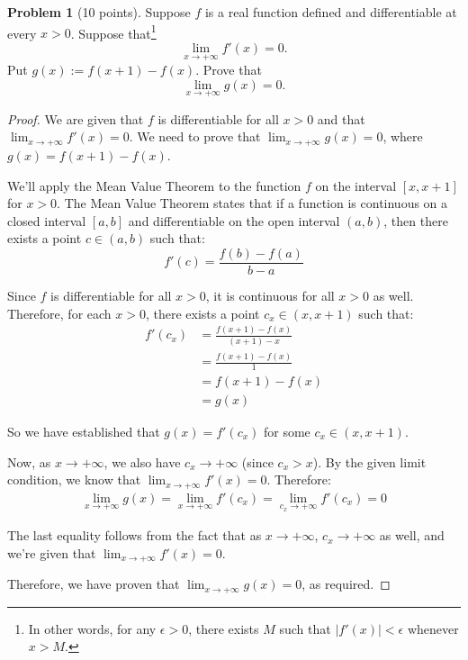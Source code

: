 \documentclass[12pt,oneside]{article}
\theoremstyle{definition}
\newtheorem{problem}{Problem}
\begin{document}
\begin{problem}[10 points]
Suppose $f$ is a real function defined and differentiable at every $x > 0$. 
Suppose that\footnote{In other words, for any $\epsilon > 0$, there exists $M$ such that $|f'(x)| < \epsilon$ whenever $x > M$.}
\[
\lim_{x \rightarrow +\infty}f'(x) = 0.
\]
Put $g(x) := f(x+1) - f(x)$. 
Prove that
\[
\lim_{x\rightarrow +\infty} g(x) = 0.
\]
\end{problem}

\begin{proof}
We are given that $f$ is differentiable for all $x > 0$ and that $\lim_{x \rightarrow +\infty}f'(x) = 0$. We need to prove that $\lim_{x\rightarrow +\infty} g(x) = 0$, where $g(x) = f(x+1) - f(x)$.

We'll apply the Mean Value Theorem to the function $f$ on the interval $[x, x+1]$ for $x > 0$. The Mean Value Theorem states that if a function is continuous on a closed interval $[a,b]$ and differentiable on the open interval $(a,b)$, then there exists a point $c \in (a,b)$ such that:
\[
f'(c) = \frac{f(b) - f(a)}{b-a}
\]

Since $f$ is differentiable for all $x > 0$, it is continuous for all $x > 0$ as well. Therefore, for each $x > 0$, there exists a point $c_x \in (x, x+1)$ such that:
\begin{align}
f'(c_x) &= \frac{f(x+1) - f(x)}{(x+1) - x} \\
&= \frac{f(x+1) - f(x)}{1} \\
&= f(x+1) - f(x) \\
&= g(x)
\end{align}

So we have established that $g(x) = f'(c_x)$ for some $c_x \in (x, x+1)$.

Now, as $x \rightarrow +\infty$, we also have $c_x \rightarrow +\infty$ (since $c_x > x$). By the given limit condition, we know that $\lim_{x \rightarrow +\infty}f'(x) = 0$. Therefore:
\begin{align}
\lim_{x\rightarrow +\infty} g(x) = \lim_{x\rightarrow +\infty} f'(c_x) = \lim_{c_x\rightarrow +\infty} f'(c_x) = 0
\end{align}

The last equality follows from the fact that as $x \rightarrow +\infty$, $c_x \rightarrow +\infty$ as well, and we're given that $\lim_{x \rightarrow +\infty}f'(x) = 0$.

Therefore, we have proven that $\lim_{x\rightarrow +\infty} g(x) = 0$, as required.
\end{proof}
\end{document}
